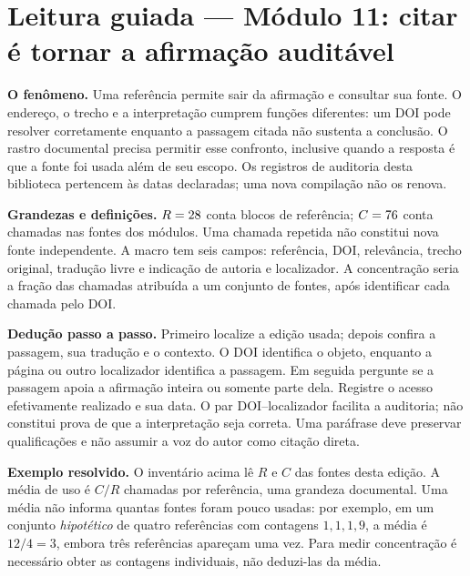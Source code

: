 \section[Leitura guiada]{Leitura guiada — Módulo 11: citar é tornar a afirmação auditável}
\begin{descricao}
\textbf{O fenômeno.} Uma referência permite sair da afirmação e consultar sua fonte.
O endereço, o trecho e a interpretação cumprem funções diferentes: um DOI pode
resolver corretamente enquanto a passagem citada não sustenta a conclusão.
O rastro documental precisa permitir esse confronto, inclusive quando a resposta
é que a fonte foi usada além de seu escopo. Os registros de auditoria desta
biblioteca pertencem às datas declaradas; uma nova compilação não os renova.
\end{descricao}
\begin{definicao}
\textbf{Grandezas e definições.} $R=28$ conta blocos de referência;
$C=76$ conta chamadas nas fontes dos módulos. Uma chamada
repetida não constitui nova fonte independente. A macro \cod{\string\citref}
tem seis campos: referência, DOI, relevância, trecho original, tradução livre
e indicação de autoria e localizador. A concentração seria a fração das chamadas
atribuída a um conjunto de fontes, após identificar cada chamada pelo DOI.
\end{definicao}
\begin{metodo}
\textbf{Dedução passo a passo.} Primeiro localize a edição usada; depois confira
a passagem, sua tradução e o contexto. O DOI identifica o objeto, enquanto a
página ou outro localizador identifica a passagem. Em seguida pergunte se a
passagem apoia a afirmação inteira ou somente parte dela. Registre o acesso
efetivamente realizado e sua data. O par DOI--localizador facilita a auditoria;
não constitui prova de que a interpretação seja correta. Uma paráfrase deve
preservar qualificações e não assumir a voz do autor como citação direta.
\end{metodo}
\begin{resultado}
\textbf{Exemplo resolvido.} O inventário acima lê $R$ e $C$ das fontes desta edição.
A média de uso é $C/R$ chamadas por referência, uma grandeza documental. Uma
média não informa quantas fontes foram pouco usadas: por exemplo, em um conjunto
\emph{hipotético} de quatro referências com contagens $1,1,1,9$, a média é
$12/4=3$, embora três referências apareçam uma vez. Para medir concentração
é necessário obter as contagens individuais, não deduzi-las da média.
\end{resultado}
